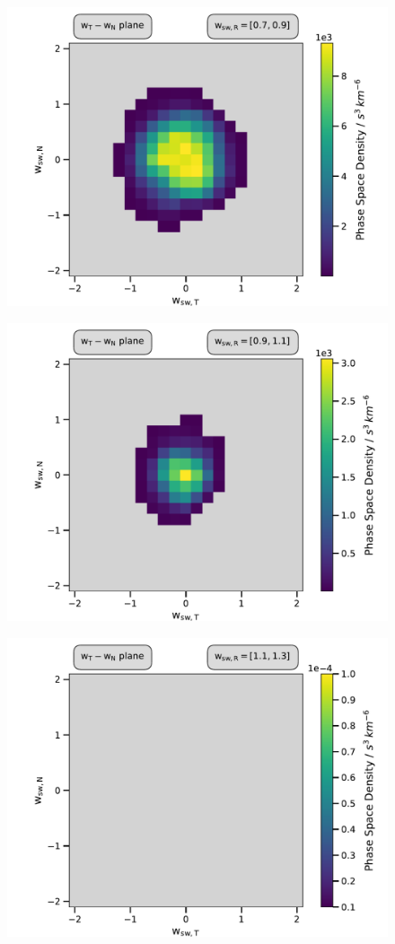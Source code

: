 \begin{figure}[h]
	\includegraphics[width=1.\textwidth]{Figures/slices_50_7.pdf}
\end{figure}

\begin{figure}[h]
	\includegraphics[width=1.\textwidth]{Figures/slices_50_9.pdf}
\end{figure}

\begin{figure}[h]
	\includegraphics[width=1.\textwidth]{Figures/slices_50_11.pdf}
\end{figure}

